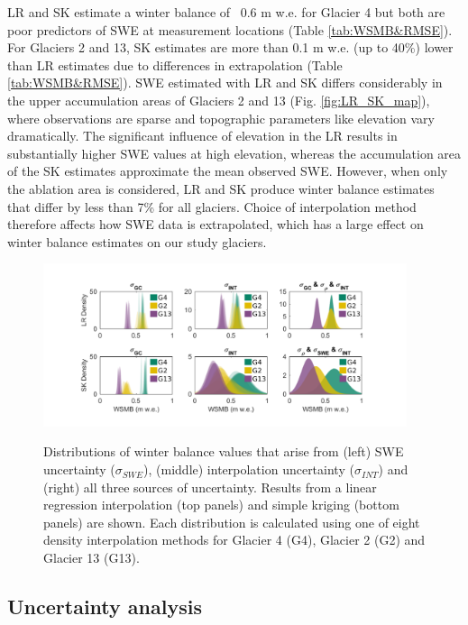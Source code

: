 \documentclass[twocolumn, letterpaper]{igs}
\begin{document}
LR and SK estimate a winter balance of ~0.6 m w.e. for Glacier 4 but both are poor predictors of SWE at measurement locations (Table \ref{tab:WSMB&RMSE}). For Glaciers 2 and 13, SK estimates are more than 0.1 m w.e. (up to 40\%) lower than LR estimates due to differences in extrapolation (Table \ref{tab:WSMB&RMSE}). SWE estimated with LR and SK differs considerably in the upper accumulation areas of Glaciers 2 and 13 (Fig. \ref{fig:LR_SK_map}), where observations are sparse and topographic parameters like elevation vary dramatically.  The significant influence of elevation in the LR results in substantially higher SWE values at high elevation, whereas the accumulation area of the SK estimates approximate the mean observed SWE. However, when only the ablation area is considered, LR and SK produce winter balance estimates that differ by less than 7\% for all glaciers. Choice of interpolation method therefore affects how SWE data is extrapolated, which has a large effect on winter balance estimates on our study glaciers. 


\begin{figure}
	\centering
	\includegraphics[width =0.95\textwidth]{WSMBDist.pdf}\\
	\caption{Distributions of winter balance values that arise from (left) SWE uncertainty ($\sigma_{SWE}$), (middle) interpolation uncertainty ($\sigma_{INT}$) and (right) all three sources of uncertainty. Results from a linear regression interpolation (top panels) and simple kriging (bottom panels) are shown. Each distribution is calculated using one of eight density interpolation methods for Glacier 4 (G4), Glacier 2 (G2) and Glacier 13 (G13).}
	\label{fig:WSMBDist_LR}
\end{figure}

\subsection{Uncertainty analysis}
\end{document}
